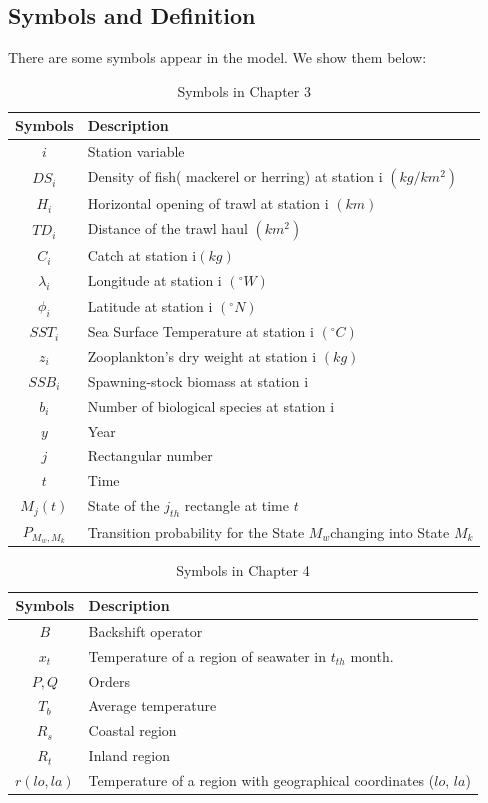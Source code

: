 \documentclass{mcmthesis}
\begin{document}
\subsection{Symbols and Definition}
There are some symbols appear in the model. We show them below:
\begin{table}[htbp]
\centering
\caption{Symbols in Chapter 3}
\begin{tabular}{cp{}}
\toprule
 Symbols & Description\\
\midrule
 $i$ & Station variable \\
 $DS_i$ & Density of fish( mackerel or herring) at station i $(kg/km^2)$\\
 $H_i$ & Horizontal opening of trawl at station i  $(km)$\\
 $TD_i$ & Distance of the trawl haul $(km^2)$ \\
 $C_i$ &  Catch at station i$(kg)$\\

  $\lambda_i$ &   Longitude at station i $(^\circ W)$\\
 $\phi_i$ &   Latitude at station i $(^\circ N)$\\
$SST_i$ &  Sea Surface Temperature at station i $(^\circ C)$\\

 $z_i$ & Zooplankton's dry weight at station i $(kg)$\\
 $SSB_i$ &  Spawning-stock biomass at station i \\
  $b_i$ & Number of biological species at station i\\
$y$ & Year \\
$j$& Rectangular number\\
$t$ & Time  \\
$M_j(t)$ & State of the $j_{th}$ rectangle at time $t$ \\
$P_{M_w,M_k}$ &  Transition probability for the State $M_w$changing into State $M_k$\\
\bottomrule
\end{tabular}
\end{table}
\begin{table}[htbp]
\centering
\caption{Symbols in Chapter 4}
\begin{tabular}{cp{}}
\toprule
 Symbols & Description\\
\midrule
$B$ &  Backshift operator\\
$x_{t}$ & Temperature of a region of seawater in $t_{th}$ month.\\
$P, Q$ & Orders\\
$T_{b}$ & Average temperature\\
$R_{s}$  & Coastal region\\
$R_{t}$ & Inland region \\
$r(lo,la)$ & Temperature of a region with geographical coordinates ($lo$, $la$)\\
\bottomrule
\end{tabular}
\end{table}
\end{document}
